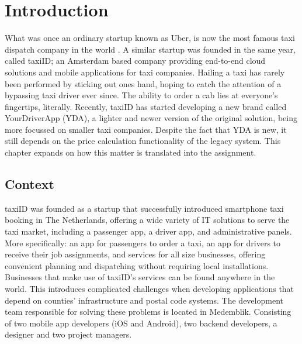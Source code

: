 \graphicspath{{Chapter1/Figs/Vector/}{Chapter1/Figs/}}

%
\chapter{Introduction}
What was once an ordinary startup known as Uber, is now the most famous taxi dispatch company in the world \cite{Uber}. A similar startup was founded in the same year, called taxiID; an Amsterdam based company providing end-to-end cloud solutions and mobile applications for taxi companies. Hailing a taxi has rarely been performed by sticking out ones hand, hoping to catch the attention of a bypassing taxi driver ever since. The ability to order a cab lies at everyone's fingertips, literally. Recently, taxiID has started developing a new brand called YourDriverApp (YDA), a lighter and newer version of the original solution, being more focussed on smaller taxi companies. Despite the fact that YDA is new, it still depends on the price calculation functionality of the legacy system. This chapter expands on how this matter is translated into the assignment.

%
\section{Context}
taxiID was founded as a startup that successfully introduced smartphone taxi booking in The Netherlands, offering a wide variety of IT solutions to serve the taxi market, including a passenger app, a driver app, and administrative panels. More specifically: an app for passengers to order a taxi, an app for drivers to receive their job assignments, and services for all size businesses, offering convenient planning and dispatching without requiring local installations. Businesses that make use of taxiID's services can be found anywhere in the world. This introduces complicated challenges when developing applications that depend on counties' infrastructure and postal code systems. The development team responsible for solving these problems is located in Medemblik. Consisting of two mobile app developers (iOS and Android), two backend developers, a designer and two project managers.

